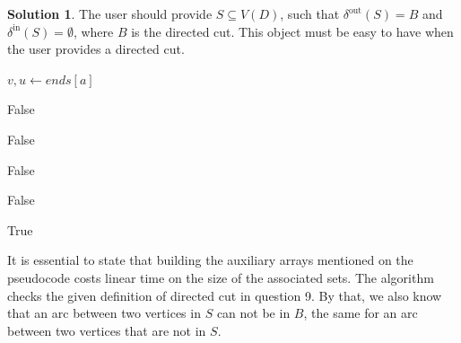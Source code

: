 \documentclass[11pt,leqno,final]{amsart}
\newcommand*{\deltaout}[1][]{\delta_{#1}^{\scriptscriptstyle \textrm{out}}}
\newcommand*{\deltain}[1][]{\delta_{#1}^{\scriptscriptstyle \textrm{in}}}
\theoremstyle{definition}
\newtheorem{solution}{Solution}
\begin{document}

\begin{solution}
The user should provide $S \subseteq V(D)$, such that $\deltaout(S) = B$ and $\deltain(S) = \emptyset$, where $B$ is the directed cut. This object must be easy to have when the user provides a directed cut. 

\begin{algorithm}
  \caption{Verify-Directed-Cut($D$, $B$, $S$)}\label{dcut}
  \begin{algorithmic}
      \State $v,u \gets ends[a]$

       
         
          \State \Return False
        \EndIf

        \State \Return False
 

          \State \Return False
        \EndIf

      \Else
          \State \Return False
        \EndIf
      \EndIf

    \EndFor

    \State \Return True
      
  \end{algorithmic}
\end{algorithm}

It is essential to state that building the auxiliary arrays mentioned on the pseudocode costs linear time on the size of the associated sets. The algorithm checks the given definition of directed cut in question 9. By that, we also know that an arc between two vertices in $S$ can not be in $B$, the same for an arc between two vertices that are not in $S$. 


\end{solution}
\end{document}

